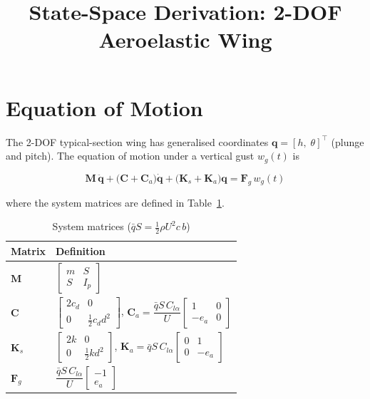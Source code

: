 \documentclass[11pt, a4paper]{article}
\title{State-Space Derivation: 2-DOF Aeroelastic Wing}
\author{}
\date{}
\begin{document}
\maketitle

\section*{Equation of Motion}

The 2-DOF typical-section wing has generalised coordinates
$\mathbf{q} = [h,\;\theta]^\top$ (plunge and pitch).
The equation of motion under a vertical gust $w_g(t)$ is

\begin{equation}
  \mathbf{M}\,\ddot{\mathbf{q}}
  + \bigl(\mathbf{C} + \mathbf{C}_a\bigr)\dot{\mathbf{q}}
  + \bigl(\mathbf{K}_s + \mathbf{K}_a\bigr)\mathbf{q}
  = \mathbf{F}_g\,w_g(t)
  \label{eq:eom}
\end{equation}

where the system matrices are defined in Table~\ref{tab:matrices}.

\begin{table}[h]
\centering
\caption{System matrices ($\bar{q}S = \tfrac{1}{2}\rho U^2 c\,b$)}
\label{tab:matrices}
\renewcommand{\arraystretch}{1.4}
\begin{tabular}{ll}
\toprule
Matrix & Definition \\
\midrule
$\mathbf{M}$
  & $\begin{bmatrix} m & S \\ S & I_p \end{bmatrix}$ \\[6pt]
$\mathbf{C}$
  & $\begin{bmatrix} 2c_d & 0 \\ 0 & \tfrac{1}{2}c_d d^2 \end{bmatrix}$,\quad
    $\mathbf{C}_a = \dfrac{\bar{q}S\,C_{l\alpha}}{U}
    \begin{bmatrix} 1 & 0 \\ -e_a & 0 \end{bmatrix}$ \\[6pt]
$\mathbf{K}_s$
  & $\begin{bmatrix} 2k & 0 \\ 0 & \tfrac{1}{2}k d^2 \end{bmatrix}$,\quad
    $\mathbf{K}_a = \bar{q}S\,C_{l\alpha}
    \begin{bmatrix} 0 & 1 \\ 0 & -e_a \end{bmatrix}$ \\[6pt]
$\mathbf{F}_g$
  & $\dfrac{\bar{q}S\,C_{l\alpha}}{U}\begin{bmatrix} -1 \\ e_a \end{bmatrix}$ \\
\bottomrule
\end{tabular}
\end{table}
\end{document}
